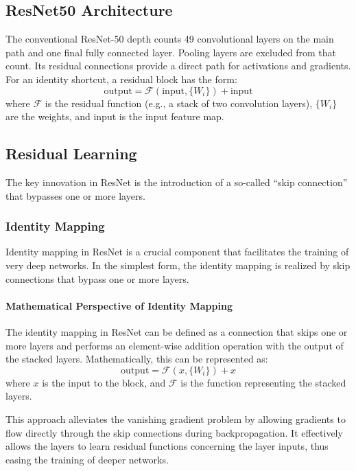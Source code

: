 \documentclass[12pt]{article}
\begin{document}
\subsection{ResNet50 Architecture}
The conventional ResNet-50 depth counts 49 convolutional layers on the main path and one final fully connected layer. Pooling layers are excluded from that count. Its residual connections provide a direct path for activations and gradients. For an identity shortcut, a residual block has the form:
\begin{equation}
    \text{output} = \mathcal{F}(\text{input}, \{W_i\}) + \text{input}
\end{equation}
where \(\mathcal{F}\) is the residual function (e.g., a stack of two convolution layers), \(\{W_i\}\) are the weights, and input is the input feature map.

\subsection{Residual Learning}
The key innovation in ResNet is the introduction of a so-called “skip connection” that bypasses one or more layers. 

\subsubsection{Identity Mapping}
Identity mapping in ResNet is a crucial component that facilitates the training of very deep networks. In the simplest form, the identity mapping is realized by skip connections that bypass one or more layers.

\paragraph{Mathematical Perspective of Identity Mapping}
The identity mapping in ResNet can be defined as a connection that skips one or more layers and performs an element-wise addition operation with the output of the stacked layers. Mathematically, this can be represented as:
\begin{equation}
    \text{output} = \mathcal{F}(x, \{W_i\}) + x
\end{equation}
where \(x\) is the input to the block, and \(\mathcal{F}\) is the function representing the stacked layers. 

This approach alleviates the vanishing gradient problem by allowing gradients to flow directly through the skip connections during backpropagation. It effectively allows the layers to learn residual functions concerning the layer inputs, thus easing the training of deeper networks.
\end{document}
